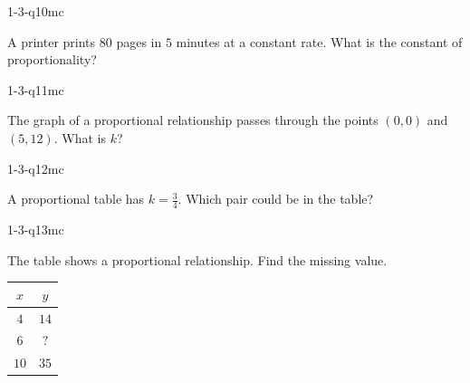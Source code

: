 \begin{practiceQuestion}{1-3-q10}{mc}
\begin{questionText}
A printer prints $80$ pages in $5$ minutes at a constant rate. What is the constant of proportionality?
\end{questionText}
\end{practiceQuestion}

\begin{practiceQuestion}{1-3-q11}{mc}
\begin{questionText}
The graph of a proportional relationship passes through the points $(0, 0)$ and $(5, 12)$. What is $k$?
\end{questionText}
\end{practiceQuestion}

\begin{practiceQuestion}{1-3-q12}{mc}
\begin{questionText}
A proportional table has $k = \frac{3}{4}$. Which pair could be in the table?
\end{questionText}
\end{practiceQuestion}

\begin{practiceQuestion}{1-3-q13}{mc}
\begin{questionText}
The table shows a proportional relationship. Find the missing value.

\begin{center}
\begin{tabular}{|c|c|}
\hline $x$ & $y$ \\ \hline $4$ & $14$ \\ $6$ & $?$ \\ $10$ & $35$ \\ \hline
\end{tabular}
\end{center}
\end{questionText}
\end{practiceQuestion}

